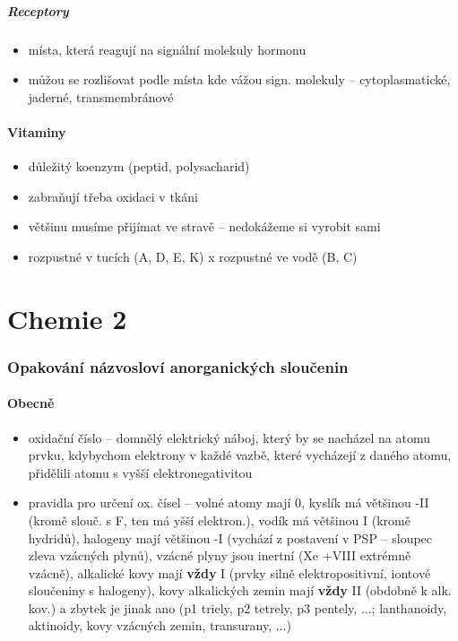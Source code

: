 \documentclass{article}
\begin{document}
\subsubsection{Receptory}
\begin{itemize}
  \item místa, která reagují na signální molekuly hormonu
  \item můžou se rozlišovat podle místa kde vážou sign. molekuly -- cytoplasmatické, jaderné, transmembránové
\end{itemize}

\subsection{Vitaminy}
\begin{itemize}
  \item důležitý koenzym (peptid, polysacharid)
  \item zabraňují třeba oxidaci v tkáni
  \item většinu musíme přijímat ve stravě -- nedokážeme si vyrobit sami
  \item rozpustné v tucích (A, D, E, K) x rozpustné ve vodě (B, C)
\end{itemize}

\part{Chemie 2}

\section{Opakování názvosloví anorganických sloučenin}

\subsection{Obecně}

\begin{itemize}
  \item oxidační číslo -- domnělý elektrický náboj, který by se nacházel na atomu prvku, kdybychom elektrony v každé vazbě, které vycházejí z daného atomu, přidělili atomu s vyšší elektronegativitou
  \item pravidla pro určení ox. čísel -- volné atomy mají 0, kyslík má většinou -II (kromě slouč. s F, ten má yšší elektron.), vodík má většinou I (kromě hydridů), halogeny mají většinou -I (vychází z postavení v PSP -- sloupec zleva vzácných plynů), vzácné plyny jsou inertní (Xe +VIII extrémně vzácně), alkalické kovy mají \textbf{vždy} I (prvky silně elektropositivní, iontové sloučeniny s halogeny), kovy alkalických zemin mají \textbf{vždy} II (obdobně k alk. kov.) a zbytek je jinak ano (p1 triely, p2 tetrely, p3 pentely, ...; lanthanoidy, aktinoidy, kovy vzácných zemin, transurany, ...)
\end{itemize}
\end{document}
